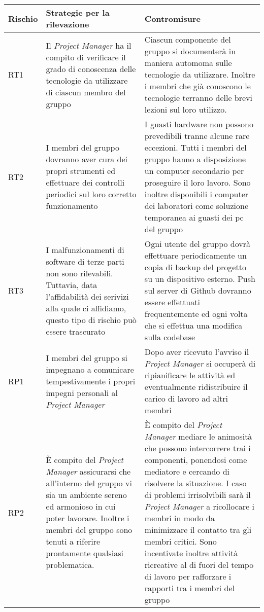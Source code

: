 \begin{longtable}[H]{|l|C{5cm}|C{7cm}|}
		\hline
		\textbf{Rischio} & \textbf{Strategie per la rilevazione}  & \textbf{Contromisure}  \\
		\hline
		RT1     & Il \emph{Project Manager} ha il compito di verificare il grado di conoscenza delle tecnologie da utilizzare di ciascun membro del gruppo & Ciascun componente del gruppo si documenterà in maniera automoma sulle tecnologie da utilizzare. Inoltre i membri che già conoscono le tecnologie terranno delle brevi lezioni sul loro utilizzo.\\
		\hline
		RT2     & I membri del gruppo dovranno aver cura dei propri strumenti ed effettuare dei controlli periodici sul loro corretto funzionamento & I guasti hardware non possono prevedibili tranne alcune rare eccezioni. Tutti i membri del gruppo hanno a disposizione un computer secondario per proseguire il loro lavoro. Sono inoltre disponibili i computer dei laboratori come soluzione temporanea ai guasti dei pc del gruppo\\
		\hline
		RT3     & I malfunzionamenti di software di terze parti non sono rilevabili. Tuttavia, data l'affidabilità dei serivizi alla quale ci affidiamo, questo tipo di rischio può essere trascurato & Ogni utente del gruppo dovrà effettuare periodicamente un copia di backup del progetto su un dispositivo esterno. Push sul server di Github dovranno essere effettuati frequentemente ed ogni volta che si effettua una modifica sulla codebase \\
		\hline
		RP1     & I membri del gruppo si impegnano a comunicare tempestivamente i propri impegni personali al \emph{Project Manager} & Dopo aver ricevuto l'avviso il \emph{Project Manager} si occuperà di ripianificare le attività ed eventualmente ridistribuire il carico di lavoro ad altri membri \\
		\hline
		RP2     & È compito del \emph{Project Manager} assicurarsi che all'interno del gruppo vi sia un ambiente sereno ed armonioso in cui poter lavorare. Inoltre i membri del gruppo sono tenuti a riferire prontamente qualsiasi problematica. & È compito del \emph{Project Manager} mediare le animosità che possono intercorrere trai i componenti, ponendosi come mediatore e cercando di risolvere la situazione. I caso di problemi irrisolvibili sarà il \emph{Project Manager} a ricollocare i membri in modo da minimizzare il contatto tra gli membri critici. Sono incentivate inoltre attività ricreative al di fuori del tempo di lavoro per rafforzare i rapporti tra i membri del gruppo\\

\end{longtable}
